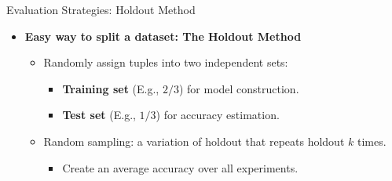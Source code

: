 \begin{frame}{Evaluation Strategies: Holdout Method}

	\begin{itemize}
		\item \textbf{Easy way to split a dataset: {\color{airforceblue} The Holdout Method}}
		      \begin{itemize}
			      \item Randomly assign tuples into two independent sets:
			            \begin{itemize}
				            \item \textbf{\color{airforceblue}Training set} (E.g., $2/3$) for model construction.
				            \item \textbf{\color{airforceblue}Test set} (E.g., $1/3$) for accuracy estimation.
			            \end{itemize}
			      \item Random sampling: a variation of holdout that repeats holdout $k$ times.
			            \begin{itemize}
				            \item Create an average accuracy over all experiments.
			            \end{itemize}
		      \end{itemize}
	\end{itemize}

\end{frame}

